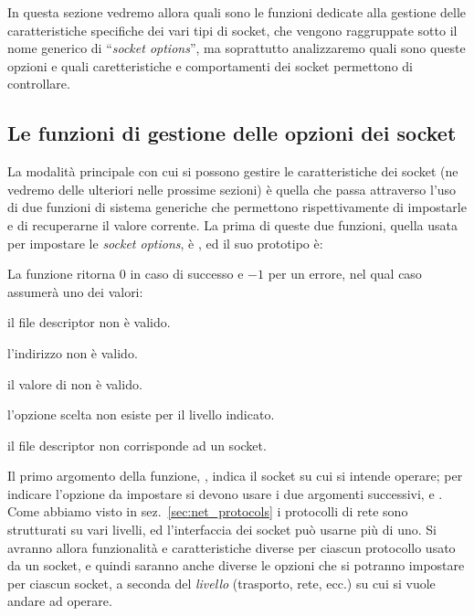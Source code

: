 In questa sezione vedremo allora quali sono le funzioni dedicate alla gestione
delle caratteristiche specifiche dei vari tipi di socket, che vengono
raggruppate sotto il nome generico di ``\textit{socket options}'', ma
soprattutto analizzaremo quali sono queste opzioni e quali caretteristiche e
comportamenti dei socket permettono di controllare.


\subsection{Le funzioni di gestione delle opzioni dei socket}
\label{sec:sock_setsockopt}

La modalità principale con cui si possono gestire le caratteristiche dei
socket (ne vedremo delle ulteriori nelle prossime sezioni) è quella che passa
attraverso l'uso di due funzioni di sistema generiche che permettono
rispettivamente di impostarle e di recuperarne il valore corrente. La prima di
queste due funzioni, quella usata per impostare le \textit{socket options}, è
, ed il suo prototipo è:

\begin{funcproto}{
}

{La funzione ritorna $0$ in caso di successo e $-1$ per un errore, nel qual
  caso  assumerà uno dei valori: 
  \begin{errlist}
  \item[\errcode{EBADF}]  il file descriptor  non è valido.
  \item[\errcode{EFAULT}] l'indirizzo  non è valido.
  \item[\errcode{EINVAL}] il valore di  non è valido.
  \item[\errcode{ENOPROTOOPT}] l'opzione scelta non esiste per il livello
    indicato. 
  \item[\errcode{ENOTSOCK}] il file descriptor  non corrisponde ad
    un socket.
  \end{errlist}
}
\end{funcproto}

Il primo argomento della funzione, , indica il socket su cui si
intende operare; per indicare l'opzione da impostare si devono usare i due
argomenti successivi,  e .  Come abbiamo visto in
sez.~\ref{sec:net_protocols} i protocolli di rete sono strutturati su vari
livelli, ed l'interfaccia dei socket può usarne più di uno. Si avranno allora
funzionalità e caratteristiche diverse per ciascun protocollo usato da un
socket, e quindi saranno anche diverse le opzioni che si potranno impostare
per ciascun socket, a seconda del \textsl{livello} (trasporto, rete, ecc.) su
cui si vuole andare ad operare.

